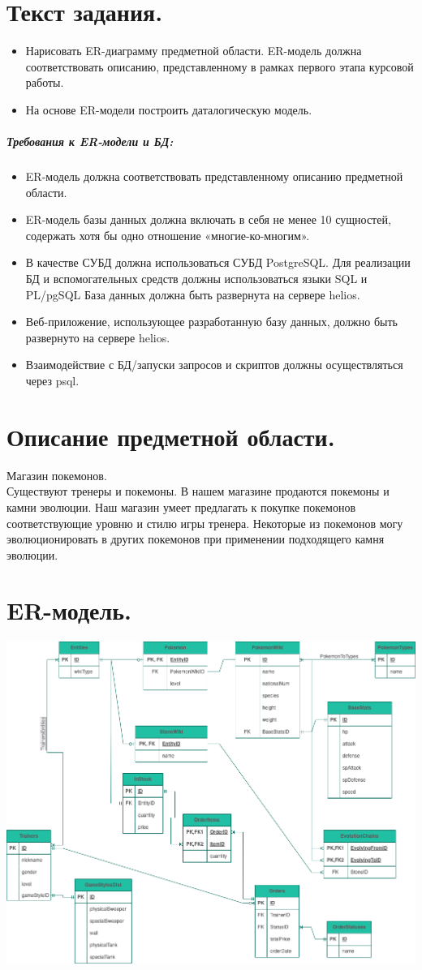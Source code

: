 \documentclass[12pt,onecolumn]{article}
\begin{document}
\section{Текст задания.}
\begin{itemize}
  \item Нарисовать ER-диаграмму предметной области. ER-модель должна соответствовать
  описанию, представленному в рамках первого этапа курсовой работы.
  \item На основе ER-модели построить даталогическую модель.
\end{itemize}
\subparagraph{Требования к ER-модели и БД:}
\begin{itemize}
  \item ER-модель должна соответствовать представленному описанию предметной области.
  \item ER-модель базы данных должна включать в себя не менее 10 сущностей, содержать
  хотя бы одно отношение «многие-ко-многим».
  \item В качестве СУБД должна использоваться СУБД PostgreSQL. Для реализации БД и
  вспомогательных средств должны использоваться языки SQL и PL/pgSQL База данных
  должна быть развернута на сервере helios.
  \item Веб-приложение, использующее разработанную базу данных, должно быть развернуто
  на сервере helios.
  \item Взаимодействие с БД/запуски запросов и скриптов должны осуществляться через psql.
\end{itemize}
\section{Описание предметной области.}
Магазин покемонов.\\
Существуют тренеры и покемоны. В нашем магазине продаются покемоны и камни эволюции. Наш магазин умеет предлагать к покупке покемонов соответствующие уровню и стилю игры тренера. Некоторые из покемонов могу эволюционировать в других покемонов при применении подходящего камня эволюции. 
\section{ER-модель.}
\includegraphics[width=\textwidth]{image/infological-model.png}
\end{document}
